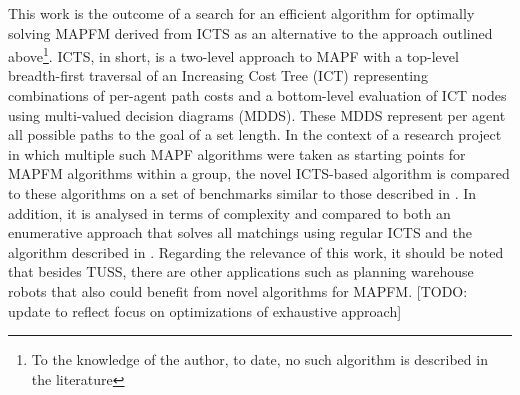 \documentclass[english]{article}
\begin{document}
	This work is the outcome of a search for an efficient algorithm for optimally solving MAPFM derived from ICTS as an alternative to the approach outlined above\footnote{To the knowledge of the author, to date, no such algorithm is described in the literature}. ICTS, in short, is a two-level approach to MAPF with a top-level breadth-first traversal of an Increasing Cost Tree (ICT) representing combinations of per-agent path costs and a bottom-level evaluation of ICT nodes using multi-valued decision diagrams (MDDS). These MDDS represent per agent all possible paths to the goal of a set length. In the context of a research project in which multiple such 
	MAPF algorithms were taken as starting points for MAPFM algorithms within a group, the novel ICTS-based algorithm is compared to these algorithms on a set of benchmarks similar to those described in \cite{stern2019}. In addition, it is analysed in terms of complexity and compared to both an enumerative approach that solves all matchings using regular ICTS and the algorithm described in \cite{ma2016}. Regarding the relevance of this work, it should be noted that besides TUSS, there are other applications such as planning warehouse robots \cite{wurman2007} that also could benefit from novel algorithms for MAPFM.
	[TODO: update to reflect focus on optimizations of exhaustive approach]
	
\end{document}
